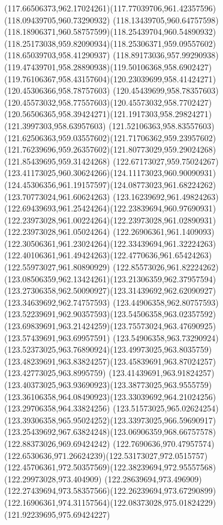 {{		\curveto(117.66506373,962.17024261)(117.77039706,961.42357596)(118.09439705,960.73290932)
		\curveto(118.13439705,960.64757598)(118.18906371,960.58757599)(118.25439704,960.54890932)
		\curveto(118.25173038,959.82090934)(118.25306371,959.09557602)(118.65039703,958.41290937)
		\curveto(118.89173036,957.99290938)(119.47439701,958.28890938)(119.50106368,958.6902427)
		\curveto(119.76106367,958.43157604)(120.23039699,958.41424271)(120.45306366,958.78757603)
		\curveto(120.45439699,958.78357603)(120.45573032,958.77557603)(120.45573032,958.7702427)
		\curveto(120.56506365,958.39424271)(121.1917303,958.29824271)(121.3997303,958.63957603)
		\curveto(121.52106363,958.83557603)(121.62506363,959.03557602)(121.71706362,959.23957602)
		\curveto(121.76239696,959.26357602)(121.80773029,959.29024268)(121.85439695,959.31424268)
		\curveto(122.67173027,959.75024267)(123.41173025,960.30624266)(124.11173023,960.90090931)
		\curveto(124.45306356,961.19157597)(124.08773023,961.68224262)(123.70773024,961.60624263)
		\curveto(123.16239692,961.49824263)(122.69439693,961.25424264)(122.23839694,960.97690931)
		\curveto(122.23973028,961.00224264)(122.23973028,961.02890931)(122.23973028,961.05024264)
		\curveto(122.26906361,961.1409093)(122.30506361,961.23024264)(122.33439694,961.32224263)
		\curveto(122.40106361,961.49424263)(122.4770636,961.65424263)(122.55973027,961.80890929)
		\curveto(122.85573026,961.82224262)(123.08506359,962.13424261)(123.21306359,962.37957594)
		\curveto(123.27306358,962.50090927)(123.31439692,962.62090927)(123.34639692,962.74757593)
		\curveto(123.44906358,962.80757593)(123.52239691,962.90357593)(123.54506358,963.02357592)
		\curveto(123.69839691,963.21424259)(123.75573024,963.47690925)(123.57439691,963.69957591)
		\curveto(123.54906358,963.73290924)(123.52373025,963.76890924)(123.49973025,963.8035759)
		\curveto(123.48239691,963.83824257)(123.45839691,963.87024257)(123.42773025,963.8995759)
		\curveto(123.41439691,963.91824257)(123.40373025,963.93690923)(123.38773025,963.9555759)
		\curveto(123.36106358,964.08490923)(123.33039692,964.21024256)(123.29706358,964.33824256)
		\curveto(123.51573025,965.02624254)(123.39306358,965.95024252)(123.33973025,966.59690917)
		\curveto(123.25439692,967.63824248)(123.06906359,968.66757578)(122.88373026,969.69424242)
		\curveto(122.7690636,970.47957574)(122.6530636,971.26624239)(122.53173027,972.0515757)
		\curveto(122.45706361,972.50357569)(122.38239694,972.95557568)(122.29973028,973.404909)
		\curveto(122.28639694,973.496909)(122.27439694,973.58357566)(122.26239694,973.67290899)
		\curveto(122.16906361,974.31157564)(122.08373028,975.01824229)(121.92239695,975.69424227)
}}
